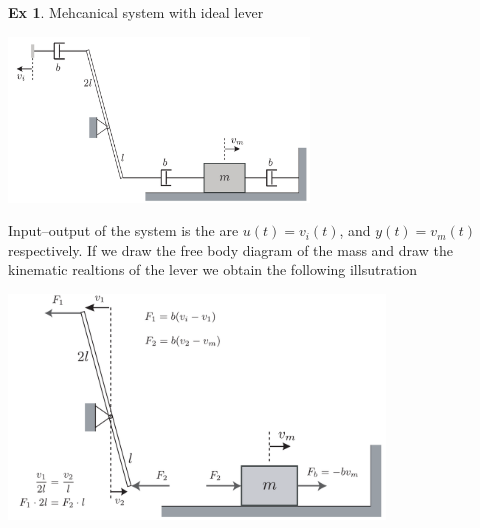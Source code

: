 \documentclass[twoside]{article}
\theoremstyle{definition}
\newtheorem{exmp}[theorem]{Ex}
\begin{document}
\begin{enumerate}
     \vspace{6pt}

\end{enumerate}


\begin{exmp}
Mehcanical system with ideal lever
\end{exmp}

\vspace{12pt}
  
\begin{minipage}[h]{1\linewidth}
    \begin{center}
      \includegraphics[width=0.6\textwidth]{leverideal}
    \end{center}
\end{minipage}   

\vspace{12pt}

Input--output of the system is the are $u(t) = v_i(t)$, and
$y(t) = v_m(t)$ respectively. If we draw the free body diagram of
the mass and draw the kinematic realtions of the lever we 
obtain the following illsutration

\vspace{12pt}
  
\begin{minipage}[h]{1\linewidth}
    \begin{center}
      \includegraphics[width=0.75\textwidth]{leverideal_solution}
    \end{center}
\end{minipage}   
\end{document}
